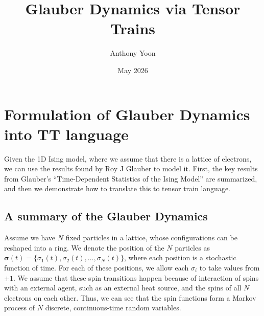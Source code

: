 \documentclass[12pt]{article}
\title{Glauber Dynamics via Tensor Trains}
\author{Anthony Yoon}
\date{May 2026}
\theoremstyle{definition}
\theoremstyle{remark}
\begin{document}
\maketitle
\tableofcontents
\newpage 
\section{Formulation of Glauber Dynamics into TT language }\label{sec:glauber}
Given the 1D Ising model, where we assume that there is a lattice of electrons, we can use the results found by Roy J Glauber to model it. First, the key results from Glauber's ``Time-Dependent Statistics of the Ising Model'' are summarized, and then we demonstrate how to translate this to tensor train language.
\subsection{A summary of the Glauber Dynamics}\label{sec:glauber-summary}
Assume we have $N$ fixed particles in a lattice, whose configurations can be reshaped into a ring. We denote the position of the $N$ particles as $\boldsymbol{\sigma}(t) = \{\sigma_1(t), \sigma_2(t), \dots, \sigma_N(t)\}$, where each position is a stochastic function of time. For each of these positions, we allow each $\sigma_i$ to take values from $\pm 1$. We assume that these spin transitions happen because of interaction of spins with an external agent, such as an external heat source, and the spins of all $N$ electrons on each other. Thus, we can see that the spin functions form a Markov process of $N$ discrete, continuous-time random variables.
\end{document}
